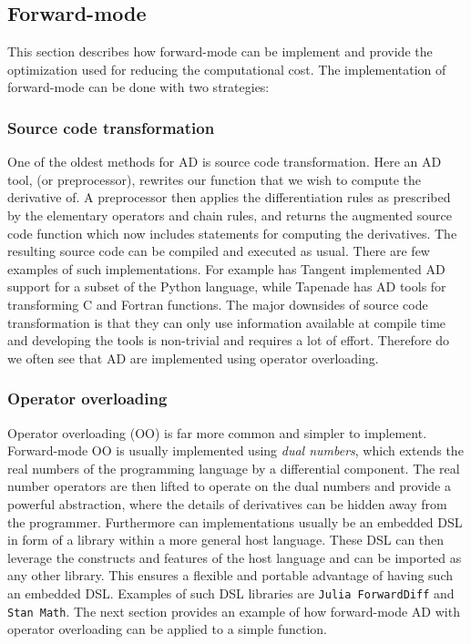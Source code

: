 	\subsection{Forward-mode}
	This section describes how forward-mode can be implement and provide the optimization
	used for reducing the computational cost. 
	The implementation of forward-mode can be done with two strategies:
	\subsubsection*{Source code transformation}
	One of the oldest methods for AD is source code transformation. Here an AD tool,
	(or preprocessor), rewrites our function that we wish to
	compute the derivative of. A preprocessor then applies the differentiation rules
	as prescribed by the elementary operators and chain rules,
	and returns the augmented source code function which now includes statements for
	computing the derivatives. The resulting source
	code can be compiled and executed as usual. There are few examples of such
	implementations.
	For example has Tangent\cite{DBLP:journals/corr/abs-1711-02712} implemented AD
	support for a subset of the Python language,
	while Tapenade has AD tools for transforming C and Fortran functions. The major
	downsides of source code transformation is that
	they can only use information available at compile time and developing the tools
	is non-trivial and requires a lot of effort.
	Therefore do we often see that AD are implemented using operator overloading.

	\subsubsection*{Operator overloading}
	Operator overloading (OO) is far more common and simpler to implement.
	Forward-mode OO is usually implemented using \emph{dual numbers}, which extends
	the real numbers
	of the programming language by a differential component. The real number
	operators are then lifted to
	operate on the dual numbers and provide a powerful abstraction, where the
	details of derivatives can
	be hidden away from the programmer. Furthermore can implementations usually be
	an embedded DSL in form of a library
	within a more general host language. These DSL can then leverage the constructs
	and features of the host language and can be imported
	as any other library. This ensures a flexible and portable advantage of having
	such an embedded DSL. Examples of such DSL libraries are
	\texttt{Julia ForwardDiff}\cite{RevelsLubinPapamarkou2016} and \texttt{Stan
		Math}\cite{DBLP:journals/corr/CarpenterHBLLB15}.
	The next section provides an example of how forward-mode AD with operator
	overloading can be applied to a simple
	function.




